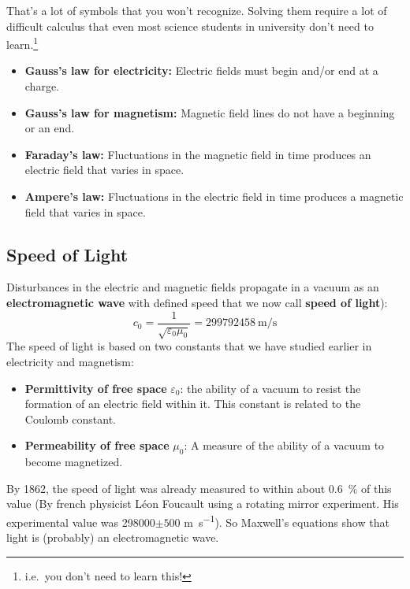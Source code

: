 That's a lot of symbols that you won't recognize. Solving them require a lot of
difficult calculus that even most science students in university don't need to
learn.\footnote{i.e.\ you don't need to learn this!}
\begin{itemize}[itemsep=6pt]
\item\textbf{Gauss's law for electricity:} Electric fields must begin and/or
  end at a charge.
\item\textbf{Gauss's law for magnetism:} Magnetic field lines do not have a
  beginning or an end.
\item\textbf{Faraday's law:} Fluctuations in the magnetic field in time
  produces an electric field that varies in space.
\item\textbf{Ampere's law:} Fluctuations in the electric field in time produces
  a magnetic field that varies in space.
\end{itemize}


\subsection{Speed of Light}

Disturbances in the electric and magnetic fields propagate in a vacuum as an
\textbf{electromagnetic wave} with defined speed that we now call
\textbf{speed of light}):
\begin{equation}
  \boxed{
    c_0=\frac1{\sqrt{\varepsilon_0\mu_0}}=\SI{299792458}{\meter\per\second}
  }
\end{equation}
The speed of light is based on two constants that we have studied earlier in
electricity and magnetism:
\begin{itemize}
\item\textbf{Permittivity of free space} $\varepsilon_0$: the ability of a
  vacuum to resist the formation of an electric field within it. This constant
  is related to the Coulomb constant.
\item\textbf{Permeability of free space} $\mu_0$: A measure of the ability
  of a vacuum to become magnetized.
\end{itemize}
By 1862, the speed of light was already measured to within about
\SI{.6}{\percent} of this value (By french physicist L\'{e}on Foucault using a
rotating mirror experiment. His experimental value was \num{298000}$\pm 500$
\si{\metre\per\second}). So Maxwell's equations show that light is (probably)
an electromagnetic wave.


\begin{figure}[ht]
  \centering
\end{figure}




